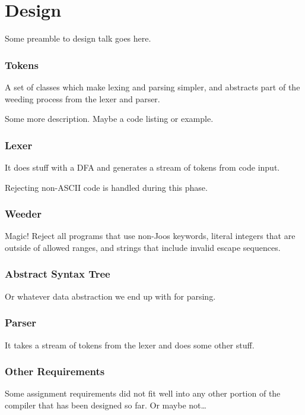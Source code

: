 \documentclass[pdftex,12pt,a4paper]{report}
\begin{document}

\part{Design}

Some preamble to design talk goes here.


\section{Tokens}

A set of classes which make lexing and parsing simpler, and abstracts
part of the weeding process from the lexer and parser.

Some more description. Maybe a code listing or example.


\section{Lexer}

It does stuff with a DFA and generates a stream of tokens from code
input.

Rejecting non-ASCII code is handled during this phase.


\section{Weeder}

Magic! Reject all programs that use non-Joos keywords, literal
integers that are outside of allowed ranges, and strings that include
invalid escape sequences.


\section{Abstract Syntax Tree}

Or whatever data abstraction we end up with for parsing.


\section{Parser}

It takes a stream of tokens from the lexer and does some other stuff.


\section{Other Requirements}

Some assignment requirements did not fit well into any other portion
of the compiler that has been designed so far. Or maybe not\ldots
\end{document}
